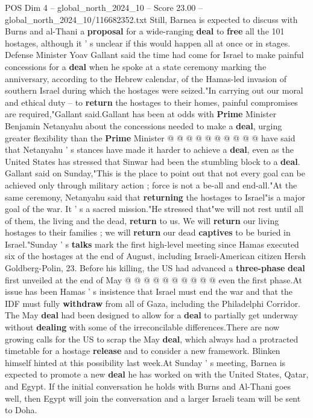 \begin{textsample}{POS Dim 4 – global\_north\_2024\_10 – Score 23.00 – global\_north\_2024\_10/116682352.txt}
Still, Barnea is expected to discuss with Burns and al-Thani a \textbf{proposal} for a wide-ranging \textbf{deal} to \textbf{free} all the 101 hostages, although it ' s unclear if this would happen all at once or in stages.
Defense Minister Yoav Gallant said the time had come for Israel to make painful concessions for a \textbf{deal} when he spoke at a state ceremony marking the anniversary, according to the Hebrew calendar, of the Hamas-led invasion of southern Israel during which the hostages were seized."In carrying out our moral and ethical duty -- to \textbf{return} the hostages to their homes, painful compromises are required,"Gallant said.Gallant has been at odds with \textbf{Prime} Minister Benjamin Netanyahu about the concessions needed to make a \textbf{deal}, urging greater flexibility than the \textbf{Prime} Minister @ @ @ @ @ @ @ @ @ @ have said that Netanyahu ' s stances have made it harder to achieve a \textbf{deal}, even as the United States has stressed that Sinwar had been the stumbling block to a \textbf{deal}.
Gallant said on Sunday,"This is the place to point out that not every goal can be achieved only through military action ; force is not a be-all and end-all."At the same ceremony, Netanyahu said that \textbf{returning} the hostages to Israel"is a major goal of the war.
It ' s a sacred mission."He stressed that"we will not rest until all of them, the living and the dead, \textbf{return} to us.
We will \textbf{return} our living hostages to their families ; we will \textbf{return} our dead \textbf{captives} to be buried in Israel."Sunday ' s \textbf{talks} mark the first high-level meeting since Hamas executed six of the hostages at the end of August, including Israeli-American citizen Hersh Goldberg-Polin, 23.
Before his killing, the US had advanced a \textbf{three-phase} \textbf{deal} first unveiled at the end of May @ @ @ @ @ @ @ @ @ @ even the first phase.At issue has been Hamas ' s insistence that Israel must end the war and that the IDF must fully \textbf{withdraw} from all of Gaza, including the Philadelphi Corridor.
The May \textbf{deal} had been designed to allow for a \textbf{deal} to partially get underway without \textbf{dealing} with some of the irreconcilable differences.There are now growing calls for the US to scrap the May \textbf{deal}, which always had a protracted timetable for a hostage \textbf{release} and to consider a new framework.
Blinken himself hinted at this possibility last week.At Sunday ' s meeting, Barnea is expected to promote a new \textbf{deal} he has worked on with the United States, Qatar, and Egypt.
If the initial conversation he holds with Burns and Al-Thani goes well, then Egypt will join the conversation and a larger Israeli team will be sent to Doha.

\end{textsample}
